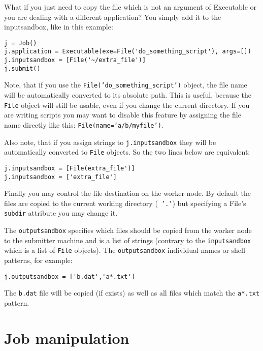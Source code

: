 \documentclass{howto}
\begin{document}
What if  you just need to  copy the file  which is not an  argument of
Executable or you are dealing with a different application? You simply
add it to the inputsandbox, like in this example:

\begin{verbatim}
j = Job()
j.application = Executable(exe=File('do_something_script'), args=[])
j.inputsandbox = [File('~/extra_file')]
j.submit()
\end{verbatim}

Note, that  if you  use the {\tt  File('do_something_script')} object,
the file  name will be  automatically converted to its  absolute path.
This is useful, because the {\tt File}  object will still be usable, even if
you change the  current directory. If you are  writing scripts you may
want to disable this feature  by assigning the file name directly like
this: {\tt File(name='a/b/myfile')}.

Also note,  that if  you assign strings  to {\tt  j.inputsandbox} they
will  be automatically  converted to  {\tt File}  objects. So  the two
lines below are equivalent:

\begin{verbatim}
j.inputsandbox = [File(extra_file')]
j.inputsandbox = ['extra_file']
\end{verbatim}

Finally you  may control the file  destination on the  worker node. By
default the  files are copied  to the current working  directory ({\tt
'.'}) but  specifying a File's  {\tt subdir} attribute you  may change
it.

The {\tt  outputsandbox} specifies which  files should be  copied from
the worker  node to  the submitter  machine and is  a list  of strings
(contrary  to the {\tt  inputsandbox} which  is a  list of  {\tt File}
objects). The {\tt  outputsandbox} individual names or shell patterns, for example:

\begin{verbatim}
j.outputsandbox = ['b.dat','a*.txt']
\end{verbatim}

The {\tt b.dat} file will be copied (if exists) as well as all files which match the 
{\tt a*.txt} pattern.


\section{Job manipulation}
\end{document}
